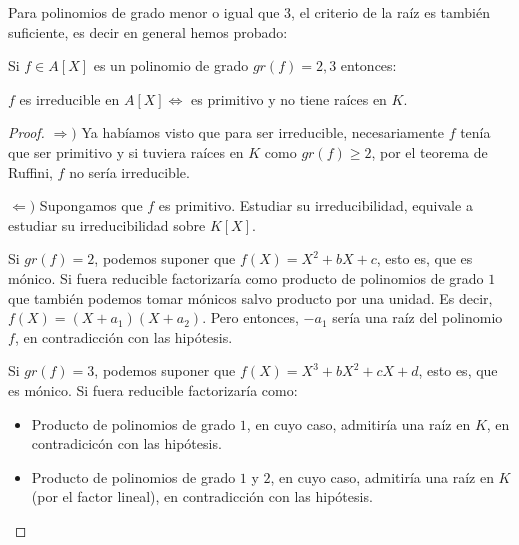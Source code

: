 Para polinomios de grado menor o igual que 3, el criterio de la raíz es también suficiente, es decir en general hemos probado:

\begin{corollary}
Si $f \in A[X]$ es un polinomio de grado $gr(f) = 2,3$ entonces: 

$f$ es irreducible en $A[X] \iff$ es primitivo y no tiene raíces en $K$. 
\end{corollary}
\begin{proof}
$\Rightarrow)$ Ya habíamos visto que para ser irreducible, necesariamente $f$ tenía que ser primitivo y si tuviera raíces en $K$ como $gr(f) \ge 2$, por el teorema de Ruffini, $f$ no sería irreducible. 

$\Leftarrow)$ Supongamos que $f$ es primitivo. Estudiar su irreducibilidad, equivale a estudiar su irreducibilidad sobre $K[X]$. 

Si $gr(f) = 2$, podemos suponer que $f(X) = X^2+bX+c$, esto es, que es mónico. Si fuera reducible factorizaría como producto de polinomios de grado $1$ que también podemos tomar mónicos salvo producto por una unidad. Es decir, $f(X) = (X+a_1)(X+a_2)$. Pero entonces, $-a_1$ sería una raíz del polinomio $f$, en contradicción con las hipótesis. 

Si $gr(f) = 3$, podemos suponer que $f(X) = X^3+bX^2+cX+d$, esto es, que es mónico. Si fuera reducible factorizaría como:

\begin{itemize}
\item Producto de polinomios de grado $1$, en cuyo caso, admitiría una raíz en $K$, en contradicicón con las hipótesis. 
\item Producto de polinomios de grado $1$ y $2$, en cuyo caso, admitiría una raíz en $K$ (por el factor lineal), en contradicción con las hipótesis. 
\end{itemize}  
\end{proof}

